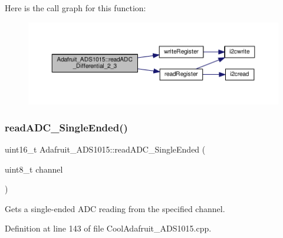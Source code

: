 Here is the call graph for this function\+:\nopagebreak
\begin{figure}[H]
\begin{center}
\leavevmode
\includegraphics[width=350pt]{class_adafruit___a_d_s1015_a38311881bcab46f7496c4bb6e4cad576_cgraph}
\end{center}
\end{figure}
\mbox{\label{class_adafruit___a_d_s1015_a40f38b9e1f3ec397c0670dd632510235}} 
\subsubsection{\texorpdfstring{read\+A\+D\+C\+\_\+\+Single\+Ended()}{readADC\_SingleEnded()}}
{\footnotesize\ttfamily uint16\+\_\+t Adafruit\+\_\+\+A\+D\+S1015\+::read\+A\+D\+C\+\_\+\+Single\+Ended (\begin{DoxyParamCaption}\item[{uint8\+\_\+t}]{channel }\end{DoxyParamCaption})}



Gets a single-\/ended A\+DC reading from the specified channel. 



Definition at line 143 of file Cool\+Adafruit\+\_\+\+A\+D\+S1015.\+cpp.

